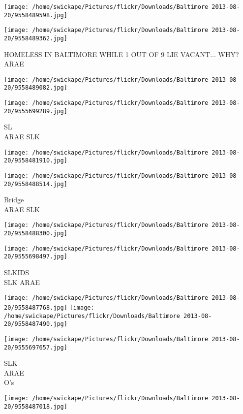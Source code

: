 \documentclass[10pt,letterpaper]{article}
\begin{document}
\texttt{[image: /home/swickape/Pictures/flickr/Downloads/Baltimore 2013-08-20/9558489598.jpg]}

\vspace{0.25in}
\texttt{[image: /home/swickape/Pictures/flickr/Downloads/Baltimore 2013-08-20/9558489362.jpg]}

HOMELESS IN BALTIMORE WHILE 1 OUT OF 9 LIE VACANT... WHY?\\
ARAE
\pagebreak

\texttt{[image: /home/swickape/Pictures/flickr/Downloads/Baltimore 2013-08-20/9558489082.jpg]}

\vspace{0.25in}
\texttt{[image: /home/swickape/Pictures/flickr/Downloads/Baltimore 2013-08-20/9555699289.jpg]}

SL\\
ARAE SLK
\pagebreak

\texttt{[image: /home/swickape/Pictures/flickr/Downloads/Baltimore 2013-08-20/9558481910.jpg]}

\vspace{0.25in}
\texttt{[image: /home/swickape/Pictures/flickr/Downloads/Baltimore 2013-08-20/9558488514.jpg]}

Bridge\\
ARAE SLK
\pagebreak

\texttt{[image: /home/swickape/Pictures/flickr/Downloads/Baltimore 2013-08-20/9558488300.jpg]}

\vspace{0.25in}
\texttt{[image: /home/swickape/Pictures/flickr/Downloads/Baltimore 2013-08-20/9555698497.jpg]}

SLKIDS\\
SLK ARAE
\pagebreak

\texttt{[image: /home/swickape/Pictures/flickr/Downloads/Baltimore 2013-08-20/9558487768.jpg]}
\texttt{[image: /home/swickape/Pictures/flickr/Downloads/Baltimore 2013-08-20/9558487490.jpg]}

\texttt{[image: /home/swickape/Pictures/flickr/Downloads/Baltimore 2013-08-20/9555697657.jpg]}

SLK\\
ARAE\\
O's
\pagebreak

\texttt{[image: /home/swickape/Pictures/flickr/Downloads/Baltimore 2013-08-20/9558487018.jpg]}
\end{document}
